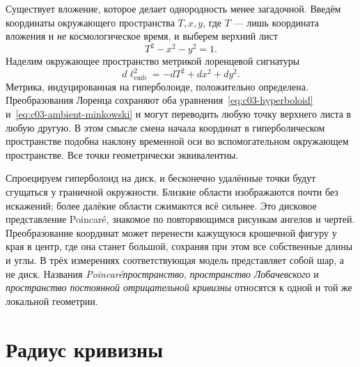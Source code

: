 Существует вложение, которое делает однородность менее загадочной. Введём координаты окружающего пространства \(T,x,y\), где \(T\) — лишь координата вложения и \emph{не} космологическое время, и выберем верхний лист
\begin{equation}
T^2 - x^2 - y^2 = 1.
\label{eq:c03-hyperboloid}
\end{equation}
Наделим окружающее пространство метрикой лоренцевой сигнатуры
\begin{equation}
d\ell_{\mathrm{emb}}^2=-dT^2+dx^2+dy^2.
\label{eq:c03-ambient-minkowski}
\end{equation}
Метрика, индуцированная на гиперболоиде, положительно определена. Преобразования Лоренца сохраняют оба уравнения~\eqref{eq:c03-hyperboloid} и~\eqref{eq:c03-ambient-minkowski} и могут переводить любую точку верхнего листа в любую другую. В этом смысле смена начала координат в гиперболическом пространстве подобна наклону временной оси во вспомогательном окружающем пространстве. Все точки геометрически эквивалентны.

Спроецируем гиперболоид на диск, и бесконечно удалённые точки будут сгущаться у граничной окружности. Близкие области изображаются почти без искажений; более далёкие области сжимаются всё сильнее. Это дисковое представление Poincar\'e, знакомое по повторяющимся рисункам ангелов и чертей. Преобразование координат может перенести кажущуюся крошечной фигуру у края в центр, где она станет большой, сохраняя при этом все собственные длины и углы. В трёх измерениях соответствующая модель представляет собой шар, а не диск. Названия \emph{Poincar\'eпространство}, \emph{пространство Лобачевского} и \emph{пространство постоянной отрицательной кривизны} относятся к одной и той же локальной геометрии.

\begin{classroomqa}
\end{classroomqa}

\section{Радиус кривизны}


